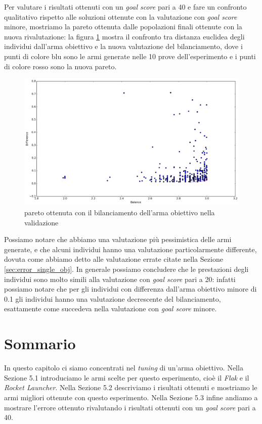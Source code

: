 \documentclass[12pt, italian]{toptesi}
\begin{document}
Per valutare i risultati ottenuti con un \emph{goal score} pari a 40 e fare un confronto qualitativo rispetto alle soluzioni ottenute con la valutazione con \emph{goal score} minore, mostriamo la pareto ottenuta dalle popolazioni finali ottenute con la nuova rivalutazione: la figura \ref{fig:pareto_single_weap_40} mostra il confronto tra distanza euclidea degli individui dall'arma obiettivo e la nuova valutazione del bilanciamento, dove i punti di colore blu sono le armi generate nelle 10 prove dell'esperimento e i punti di colore rosso sono la nuova pareto.
\begin{figure}[htp]
\centering
\includegraphics[width=1.0\textwidth]{pareto_single_weap_40}
\caption{pareto ottenuta con il bilanciamento dell'arma obiettivo nella validazione}
\label{fig:pareto_single_weap_40}
\end{figure}
Possiamo notare che abbiamo una valutazione più pessimistica delle armi generate, e che alcuni individui hanno una valutazione particolarmente differente, dovuta come abbiamo detto alle valutazione errate citate nella Sezione \ref{sec:error_single_obj}.
In generale possiamo concludere che le prestazioni degli individui sono molto simili alla valutazione con \emph{goal score} pari a 20: infatti possiamo notare che per gli individui con differenza dall'arma obiettivo minore di 0.1 gli individui hanno una valutazione decrescente del bilanciamento, esattamente come succedeva nella valutazione con \emph{goal score} minore.


\section{Sommario}
In questo capitolo ci siamo concentrati nel \emph{tuning} di un'arma obiettivo.
Nella Sezione 5.1 introduciamo le armi scelte per questo esperimento, cioè il \emph{Flak} e il \emph{Rocket Launcher}.
Nella Sezione 5.2 descriviamo i risultati ottenuti e mostriamo le armi migliori ottenute con questo esperimento.
Nella Sezione 5.3 infine andiamo a mostrare l'errore ottenuto rivalutando i risultati ottenuti con un \emph{goal score} pari a 40.
\end{document}

